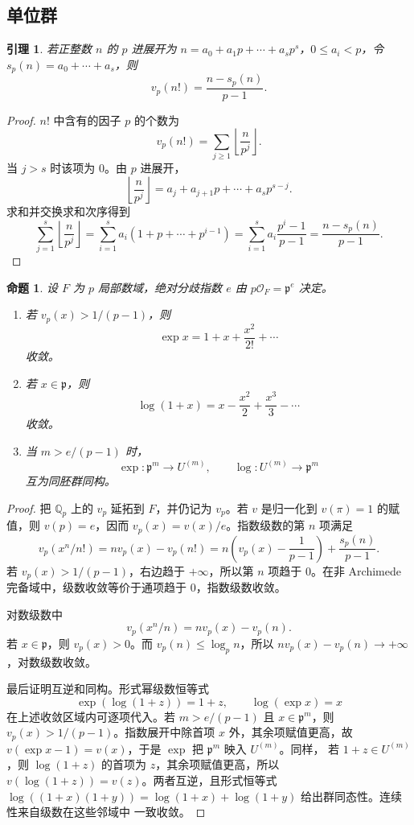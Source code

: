 \documentclass[11pt,a4paper,openany]{ctexbook}
\numberwithin{equation}{chapter}
\newcommand{\Q}{\mathbb{Q}}
\theoremstyle{plain}
\newtheorem{proposition}[theorem]{命题}
\newtheorem{lemma}[theorem]{引理}
\theoremstyle{definition}
\theoremstyle{remark}
\begin{document}
\subsection{单位群}

\begin{lemma}
若正整数 $n$ 的 $p$ 进展开为 $n=a_0+a_1p+\cdots+a_sp^s$，$0\le a_i<p$，令
$s_p(n)=a_0+\cdots+a_s$，则
\[
v_p(n!)=\frac{n-s_p(n)}{p-1}.
\]
\end{lemma}

\begin{proof}
$n!$ 中含有的因子 $p$ 的个数为
\[
v_p(n!)=\sum_{j\ge1}\left\lfloor\frac n{p^j}\right\rfloor.
\]
当 $j>s$ 时该项为 $0$。由 $p$ 进展开，
\[
\left\lfloor\frac n{p^j}\right\rfloor
=a_j+a_{j+1}p+\cdots+a_sp^{s-j}.
\]
求和并交换求和次序得到
\[
\sum_{j=1}^s\left\lfloor\frac n{p^j}\right\rfloor
=\sum_{i=1}^s a_i(1+p+\cdots+p^{i-1})
=\sum_{i=1}^s a_i\frac{p^i-1}{p-1}
=\frac{n-s_p(n)}{p-1}.
\]
\end{proof}

\begin{proposition}
设 $F$ 为 $p$ 局部数域，绝对分歧指数 $e$ 由 $p\mathcal O_F=\mathfrak p^e$ 决定。
\begin{enumerate}[label=(\arabic*)]
\item 若 $v_p(x)>1/(p-1)$，则
\[
\exp x=1+x+\frac{x^2}{2!}+\cdots
\]
收敛。
\item 若 $x\in\mathfrak p$，则
\[
\log(1+x)=x-\frac{x^2}{2}+\frac{x^3}{3}-\cdots
\]
收敛。
\item 当 $m>e/(p-1)$ 时，
\[
\exp:\mathfrak p^m\longrightarrow U^{(m)},\qquad
\log:U^{(m)}\longrightarrow\mathfrak p^m
\]
互为同胚群同构。
\end{enumerate}
\end{proposition}

\begin{proof}
把 $\Q_p$ 上的 $v_p$ 延拓到 $F$，并仍记为 $v_p$。若 $v$ 是归一化到
$v(\pi)=1$ 的赋值，则 $v(p)=e$，因而 $v_p(x)=v(x)/e$。指数级数的第 $n$ 项满足
\[
v_p(x^n/n!)=n v_p(x)-v_p(n!)
=n\left(v_p(x)-\frac1{p-1}\right)+\frac{s_p(n)}{p-1}.
\]
若 $v_p(x)>1/(p-1)$，右边趋于 $+\infty$，所以第 $n$ 项趋于 $0$。在非
Archimede 完备域中，级数收敛等价于通项趋于 $0$，指数级数收敛。

对数级数中
\[
v_p(x^n/n)=n v_p(x)-v_p(n).
\]
若 $x\in\mathfrak p$，则 $v_p(x)>0$。而 $v_p(n)\le\log_p n$，所以
$n v_p(x)-v_p(n)\to+\infty$，对数级数收敛。

最后证明互逆和同构。形式幂级数恒等式
\[
\exp(\log(1+z))=1+z,\qquad \log(\exp x)=x
\]
在上述收敛区域内可逐项代入。若 $m>e/(p-1)$ 且 $x\in\mathfrak p^m$，则
$v_p(x)>1/(p-1)$。指数展开中除首项 $x$ 外，其余项赋值更高，故
$v(\exp x-1)=v(x)$，于是 $\exp$ 把 $\mathfrak p^m$ 映入 $U^{(m)}$。同样，
若 $1+z\in U^{(m)}$，则 $\log(1+z)$ 的首项为 $z$，其余项赋值更高，所以
$v(\log(1+z))=v(z)$。两者互逆，且形式恒等式
$\log((1+x)(1+y))=\log(1+x)+\log(1+y)$ 给出群同态性。连续性来自级数在这些邻域中
一致收敛。
\end{proof}
\end{document}
